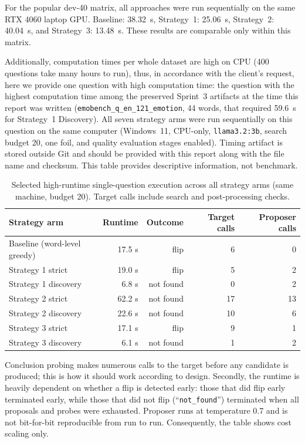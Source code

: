 \documentclass[11pt,a4paper]{article}
\begin{document}
For the popular dev-40 matrix, all approaches were run sequentially on the same RTX
4060 laptop GPU. Baseline: 38.32~s, Strategy~1: 25.06~s, Strategy~2: 40.04~s, and
Strategy~3: 13.48~s. These results are comparable only within this matrix.

Additionally, computation times per whole dataset are high on CPU (400 questions take
many hours to run), thus, in accordance with the client's request, here we provide one
question with high computation time: the question with the highest computation time
among the preserved Sprint~3 artifacts at the time this report was written
(\texttt{emobench\_q\_en\_121\_emotion}, 44 words, that required 59.6~s for Strategy~1
Discovery). All seven strategy arms were run sequentially on this question on the same
computer (Windows~11, CPU-only, \texttt{llama3.2:3b}, search budget 20, one foil, and
quality evaluation stages enabled). Timing artifact is stored outside Git and should
be provided with this report along with the file name and checksum. This table
provides descriptive information, not benchmark.

\begin{table}[htbp]
\centering
\small
\begin{tabularx}{\textwidth}{@{}Y r r r r@{}}
\toprule
\textbf{Strategy arm} & \textbf{Runtime} & \textbf{Outcome} & \textbf{Target calls} & \textbf{Proposer calls} \\
\midrule
Baseline (word-level greedy) & 17.5 s & flip & 6 & 0 \\
Strategy 1 strict & 19.0 s & flip & 5 & 2 \\
Strategy 1 discovery & 6.8 s & not found & 0 & 2 \\
Strategy 2 strict & 62.2 s & not found & 17 & 13 \\
Strategy 2 discovery & 22.6 s & not found & 10 & 6 \\
Strategy 3 strict & 17.1 s & flip & 9 & 1 \\
Strategy 3 discovery & 6.1 s & not found & 1 & 2 \\
\bottomrule
\end{tabularx}
\caption{Selected high-runtime single-question execution across all strategy arms
(same machine, budget 20). Target calls include search and post-processing checks.}
\label{tab:runtime}
\end{table}

Conclusion probing makes numerous calls to the target before any candidate is
produced; this is how it should work according to design. Secondly, the runtime is
heavily dependent on whether a flip is detected early: those that did flip early
terminated early, while those that did not flip (``\texttt{not\_found}'') terminated
when all proposals and probes were exhausted. Proposer runs at temperature 0.7 and is
not bit-for-bit reproducible from run to run. Consequently, the table shows cost
scaling only.
\end{document}
